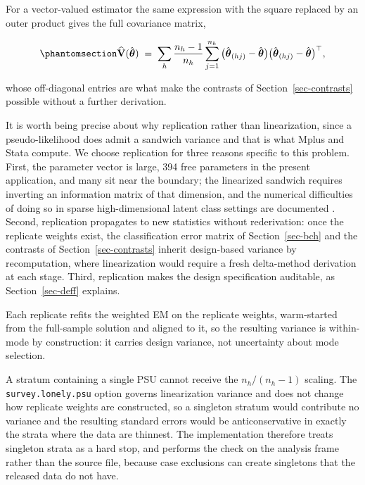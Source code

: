 \documentclass[
  12pt]{article}
\begin{document}
For a vector-valued estimator the same expression with the square
replaced by an outer product gives the full covariance matrix,

\begin{equation}\phantomsection\label{eq-jknmat}{
\widehat{\mathbf{V}}(\hat{\boldsymbol\theta}) \;=\; \sum_{h} \frac{n_h - 1}{n_h}
\sum_{j=1}^{n_h} \big( \hat{\boldsymbol\theta}_{(hj)} - \hat{\boldsymbol\theta} \big)
\big( \hat{\boldsymbol\theta}_{(hj)} - \hat{\boldsymbol\theta} \big)^{\top},
}\end{equation}

whose off-diagonal entries are what make the contrasts of
Section~\ref{sec-contrasts} possible without a further derivation.

It is worth being precise about why replication rather than
linearization, since a pseudo-likelihood does admit a sandwich variance
\citep{binder1983} and that is what Mplus and Stata compute. We choose
replication for three reasons specific to this problem. First, the
parameter vector is large, 394 free parameters in the present
application, and many sit near the boundary; the linearized sandwich
requires inverting an information matrix of that dimension, and the
numerical difficulties of doing so in sparse high-dimensional latent
class settings are documented \citep{patterson2002, wu2024}. Second,
replication propagates to new statistics without rederivation: once the
replicate weights exist, the classification error matrix of
Section~\ref{sec-bch} and the contrasts of Section~\ref{sec-contrasts}
inherit design-based variance by recomputation, where linearization
would require a fresh delta-method derivation at each stage. Third,
replication makes the design specification auditable, as
Section~\ref{sec-deff} explains.

Each replicate refits the weighted EM on the replicate weights,
warm-started from the full-sample solution and aligned to it, so the
resulting variance is within-mode by construction: it carries design
variance, not uncertainty about mode selection.

A stratum containing a single PSU cannot receive the \(n_h/(n_h-1)\)
scaling. The \texttt{survey.lonely.psu} option governs linearization
variance and does not change how replicate weights are constructed, so a
singleton stratum would contribute no variance and the resulting
standard errors would be anticonservative in exactly the strata where
the data are thinnest. The implementation therefore treats singleton
strata as a hard stop, and performs the check on the analysis frame
rather than the source file, because case exclusions can create
singletons that the released data do not have.
\end{document}
